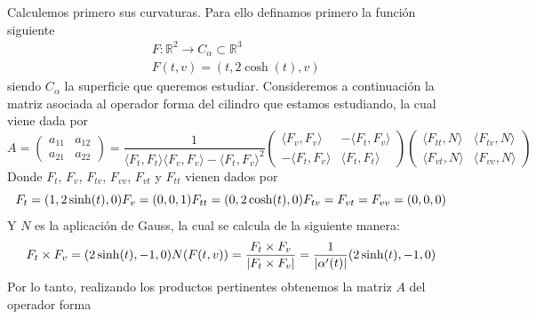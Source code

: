 \documentclass[fleqn]{article}
\def\R{\mathds{R}}
\begin{document}
    Calculemos primero sus curvaturas. Para ello definamos primero la función siguiente
    \begin{equation*}
        \begin{aligned}
            & F:\R^2 \rightarrow C_{\alpha} \subset \R^3 \\
            &F(t,v) = (t, 2\cosh(t), v)
        \end{aligned}
    \end{equation*}
    siendo $C_{\alpha}$ la superficie que queremos estudiar. Consideremos a continuación la matriz asociada al operador forma del cilindro que estamos estudiando, 
    la cual viene dada por
    \begin{equation*}
        A =
        \begin{pmatrix}
            a_{11} & a_{12} \\
            a_{21} & a_{22}
        \end{pmatrix}
        = \frac{1}{\langle F_t, F_t \rangle \langle F_v, F_v \rangle - \langle F_t, F_v \rangle ^2}
        \begin{pmatrix}
            \langle F_v, F_v \rangle & - \langle F_t, F_v \rangle \\
            -\langle F_t, F_v \rangle & \langle F_t, F_t \rangle
        \end{pmatrix}
        \begin{pmatrix}
            \langle F_{tt}, N \rangle & \langle F_{tv}, N \rangle \\
            \langle F_{vt}, N \rangle & \langle F_{vv}, N \rangle
        \end{pmatrix}
    \end{equation*}
    Donde $F_t$, $F_v$, $F_{tv}$, $F_{vv}$, $F_{vt}$ y $F_{tt}$ vienen dados por
    \begin{equation*}
        F_t = (1, 2\sinh(t), 0) \\
        F_v = (0, 0, 1) \\
        F_{tt} = (0, 2\cosh(t), 0) \\
        F_{tv} = F_{vt} = F_{vv} = (0, 0, 0)
    \end{equation*}
    Y $N$ es la aplicación de Gauss, la cual se calcula de la siguiente manera:
    \begin{equation*}
        F_t \times F_v = (2\sinh(t), -1, 0) \\
        N(F(t,v)) = \frac{F_t \times F_v}{|F_t \times F_v|} = \frac{1}{|\alpha'(t)|} (2\sinh(t), -1, 0)
    \end{equation*}
    Por lo tanto, realizando los productos pertinentes obtenemos la matriz $A$ del operador forma
\end{document}
